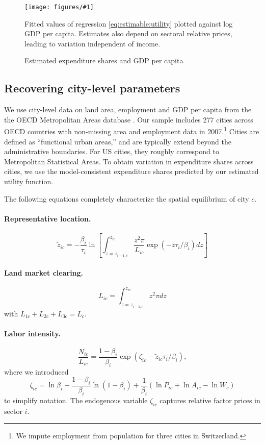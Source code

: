 \documentclass[12pt]{article}
\newcommand{\dofigure}[3]{\begin{figure}
\begin{centering}
\texttt{[image: figures/\#1]}
  \caption{#2\label{fig:#1}}
\end{centering}

\noindent \footnotesize{#3}
\end{figure}}
\begin{document}
\dofigure{city_level_inputs/expenditure_shares}{Estimated expenditure shares and GDP per capita}{Fitted values of regression \eqref{eq:estimable:utility} plotted against log GDP per capita. Estimates also depend on sectoral relative prices, leading to variation independent of income.}

\subsection{Recovering city-level parameters}
We use city-level data on land area, employment and GDP per capita from the the OECD Metropolitan Areas database \cite{oecd}. Our sample includes 277 cities across OECD countries with non-missing area and employment data in 2007.\footnote{We impute employment from population for three cities in Switzerland.} Cities are defined as ``functional urban areas,'' and are typically extend beyond the administrative boundaries. For US cities, they roughly correspond to Metropolitan Statistical Areas. To obtain variation in expenditure shares across cities, we use the model-consistent expenditure shares predicted by our estimated utility function. 

The following equations completely characterize the spatial equilibrium of city $c$.

\paragraph{Representative location.}
\begin{equation}\label{eq:representative_location}
	\tilde z_{ic}
	=
	- \frac {\beta_i}{\tau_i}
	\ln
	\left[
	\int_{z=z_{i-1,c}}^{z_{ic}}
		\frac {z^2\pi}{L_{ic}}
		\exp(-z \tau_i/\beta_i)
		dz
	\right]
\end{equation}
\paragraph{Land market clearing.}
\begin{equation}\label{eq:land_market_clearing}
	L_{ic}
	=
	\int_{z=z_{i-1,c}}^{z_{ic}}
		z^2\pi
		dz
\end{equation}
with $L_{1c}+L_{2c}+L_{3c}=L_c$.

\paragraph{Labor intensity.}
\begin{equation}\label{eq:labor_intensity}
	\frac 	{N_{ic}}
			{L_{ic}}
	=
	\frac 	{1-\beta_i}
			{\beta_i}
	\exp(\zeta_{ic}-\tilde z_{ic} \tau_i/\beta_i),
\end{equation}
where we introduced
\[
\zeta_{ic}=\ln\beta_i + \frac{1-\beta_i}{\beta_i} \ln (1-\beta_i)
+ \frac 1{\beta_i} (\ln P_{ic} + \ln A_{ic} - \ln W_c)
\]
to simplify notation. The endogenous variable $\zeta_{ic}$ captures relative factor prices in sector $i$.
\end{document}
